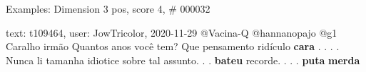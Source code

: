 \begin{frame}{Examples: Dimension 3 pos, score 4, \# 000032}
\footnotesize
\begin{exampleblock}{text: t109464, user: JowTricolor, 2020-11-29}
@Vacina-Q @hannanopajo @g1 Caralho irmão Quantos anos você tem? Que pensamento 
ridículo \textbf{cara} . . . . Nunca li tamanha idiotice sobre tal assunto. . . 
\textbf{bateu} recorde. . . . \textbf{puta} \textbf{merda} 
\end{exampleblock}
\end{frame}
